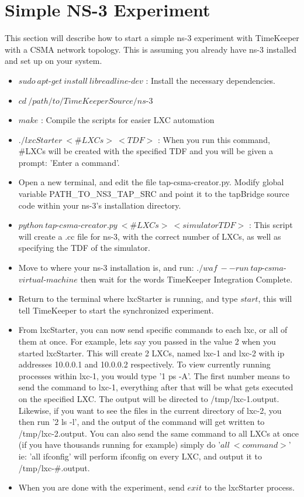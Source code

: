 \section{Simple NS-3 Experiment}
This section will describe how to start a simple ns-3 experiment with TimeKeeper with a CSMA network topology. This is assuming you already have ns-3 installed and set up on your system.
\begin{itemize}
\item $sudo\ apt$-$get\ install\ libreadline$-$dev$ : Install the necessary dependencies.
\item $cd\ /path/to/TimeKeeperSource/ns$-$3$
\item $make$ : Compile the scripts for easier LXC automation
\item $./lxcStarter\ <\#LXCs>\ <TDF>$ : When you run this command, \#LXCs will be created with the specified TDF and you will be given a prompt: 'Enter a command'.
\item Open a new terminal, and edit the file tap-csma-creator.py. Modify global variable PATH\_TO\_NS3\_TAP\_SRC and point it to the tapBridge source code within your ns-3's installation directory.
\item $python\ tap$-$csma$-$creator.py\ <\#LXCs>\ <simulatorTDF>$ : This script will create a .cc file for ns-3, with the correct number of LXCs, as well as specifying the TDF of the simulator. 
\item Move to where your ns-3 installation is, and run: $./waf\ --run\ tap$-$csma$-$virtual$-$machine$ then wait for the words TimeKeeper Integration Complete.
\item Return to the terminal where lxcStarter is running, and type $start$, this will tell TimeKeeper to start the synchronized experiment.
\item From lxcStarter, you can now send specific commands to each lxc, or all of them at once. For example, lets say you passed in the value 2 when you started lxcStarter. This will create 2 LXCs, named lxc-1 and lxc-2 with ip addresses 10.0.0.1 and 10.0.0.2 respectively. To view currently running processes within lxc-1, you would type '1 ps -A'. The first number means to send the command to lxc-1, everything after that will be what gets executed on the specified LXC. The output will be directed to /tmp/lxc-1.output. Likewise, if you want to see the files in the current directory of lxc-2, you then run '2 ls -l', and the output of the command will get written to /tmp/lxc-2.output. You can also send the same command to all LXCs at once (if you have thousands running for example) simply do '$all\ <command>$' ie: 'all ifconfig' will perform ifconfig on every LXC, and output it to /tmp/lxc-\#.output.  
\item When you are done with the experiment, send $exit$ to the lxcStarter process.
\end{itemize}

